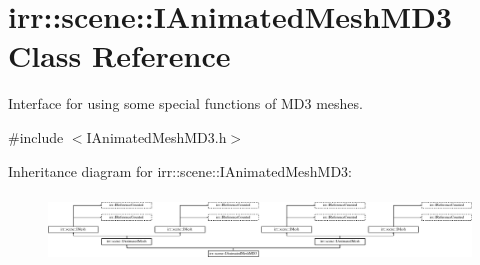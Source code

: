 \hypertarget{classirr_1_1scene_1_1IAnimatedMeshMD3}{}\section{irr\+:\+:scene\+:\+:I\+Animated\+Mesh\+M\+D3 Class Reference}
\label{classirr_1_1scene_1_1IAnimatedMeshMD3}


Interface for using some special functions of M\+D3 meshes.  




{\ttfamily \#include $<$I\+Animated\+Mesh\+M\+D3.\+h$>$}

Inheritance diagram for irr\+:\+:scene\+:\+:I\+Animated\+Mesh\+M\+D3\+:\begin{figure}[H]
\begin{center}
\leavevmode
\includegraphics[height=1.822917cm]{classirr_1_1scene_1_1IAnimatedMeshMD3}
\end{center}
\end{figure}
